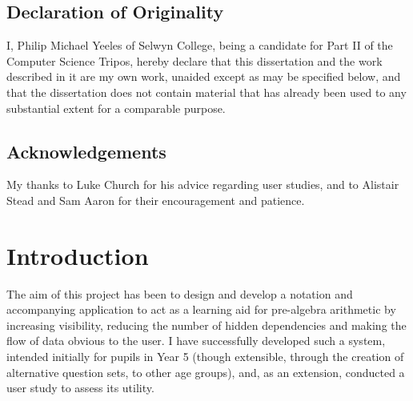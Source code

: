 \documentclass[12pt,twoside,notitlepage,xetex]{report}
\begin{document}
\newpage
\section*{Declaration of Originality}

I, Philip Michael Yeeles of Selwyn College, being a candidate for Part
II of the Computer Science Tripos, hereby declare that this dissertation
and the work described in it are my own work, unaided except as may be
specified below, and that the dissertation does not contain material
that has already been used to any substantial extent for a comparable
purpose.

\bigskip
{}

\medskip
{}

\cleardoublepage

\tableofcontents

\listoffigures

\newpage
\section*{Acknowledgements}
My thanks to Luke Church for his advice regarding user studies, and to Alistair
Stead and Sam Aaron for their encouragement and patience.
%


\cleardoublepage        %

\setcounter{page}{1}
\pagestyle{headings}

\chapter{Introduction}

The aim of this project has been to design and develop a notation and
accompanying application to act as a learning aid for pre-algebra arithmetic by
increasing visibility, reducing the number of hidden dependencies and making the
flow of data obvious to the user.  I have successfully developed such a system,
intended initially for pupils in Year 5 (though extensible, through the creation
of alternative question sets, to other age groups), and, as an extension,
conducted a user study to assess its utility.
\end{document}
